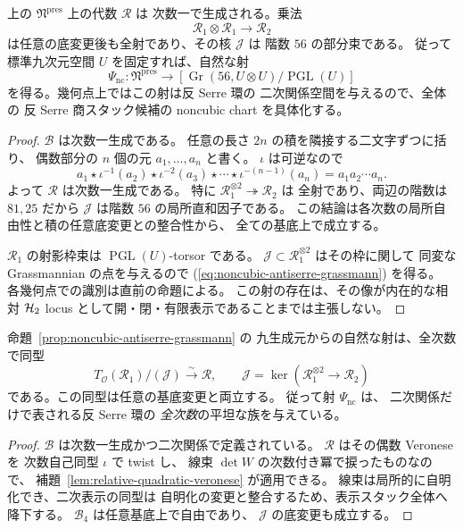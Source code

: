 \begin{proposition}[九生成元の相対二次関係と商スタックへの射]
\label{prop:noncubic-antiserre-grassmann}
上の $\mathfrak N^{\mathrm{pres}}$ 上の代数 $\mathcal R$ は
次数一で生成される。乗法
\[
 \mathcal R_1\otimes\mathcal R_1
    \longrightarrow\mathcal R_2
\]
は任意の底変更後も全射であり、その核 $\mathcal J$ は
階数 $56$ の部分束である。
従って標準九次元空間 $U$ を固定すれば、自然な射
\[
 \Psi_{\mathrm{nc}}:
 \mathfrak N^{\mathrm{pres}}
 \longrightarrow
 \left[\operatorname{Gr}(56,U\otimes U)/\operatorname{PGL}(U)\right]
 \tag{NC-Gr}\label{eq:noncubic-antiserre-grassmann}
\]
を得る。幾何点上ではこの射は反 Serre 環の
二次関係空間を与えるので、全体の
反 Serre 商スタック候補の noncubic chart を具体化する。
\end{proposition}
\begin{proof}
$\mathcal B$ は次数一生成である。
任意の長さ $2n$ の積を隣接する二文字ずつに括り、
偶数部分の $n$ 個の元 $a_1,\ldots,a_n$ と書く。
$\iota$ は可逆なので
\[
 a_1\star\iota^{-1}(a_2)\star
       \iota^{-2}(a_3)\star\cdots\star
       \iota^{-(n-1)}(a_n)
 =a_1a_2\cdots a_n .
\]
よって $\mathcal R$ は次数一生成である。
特に $\mathcal R_1^{\otimes2}\twoheadrightarrow\mathcal R_2$ は
全射であり、両辺の階数は $81,25$ だから
$\mathcal J$ は階数 $56$ の局所直和因子である。
この結論は各次数の局所自由性と積の任意底変更との整合性から、
全ての基底上で成立する。

$\mathcal R_1$ の射影枠束は $\operatorname{PGL}(U)$-torsor である。
$\mathcal J\subset\mathcal R_1^{\otimes2}$ はその枠に関して
同変な Grassmannian の点を与えるので
(\ref{eq:noncubic-antiserre-grassmann}) を得る。
各幾何点での識別は直前の命題による。
この射の存在は、その像が内在的な相対 $\mathcal H_2$ locus
として開・閉・有限表示であることまでは主張しない。
\end{proof}

\begin{corollary}
\label{cor:noncubic-relative-full-quadratic-presentation}
命題~\ref{prop:noncubic-antiserre-grassmann} の
九生成元からの自然な射は、全次数で同型
\[
 T_{\mathcal O}(\mathcal R_1)/(\mathcal J)
       \xrightarrow{\ \sim\ }\mathcal R,
 \qquad
 \mathcal J=\ker(\mathcal R_1^{\otimes2}\to\mathcal R_2)
 \tag{NC-quad}\label{eq:noncubic-relative-quadratic-presentation}
\]
である。この同型は任意の基底変更と両立する。
従って射 $\Psi_{\mathrm{nc}}$ は、
二次関係だけで表される反 Serre 環の
\emph{全次数}の平坦な族を与えている。
\end{corollary}
\begin{proof}
$\mathcal B$ は次数一生成かつ二次関係で定義されている。
$\mathcal R$ はその偶数 Veronese を
次数自己同型 $\iota$ で twist し、
線束 $\det W$ の次数付き冪で捩ったものなので、
補題~\ref{lem:relative-quadratic-veronese} が適用できる。
線束は局所的に自明化でき、二次表示の同型は
自明化の変更と整合するため、表示スタック全体へ降下する。
$\mathcal B_4$ は任意基底上で自由であり、
$\mathcal J$ の底変更も成立する。
\end{proof}

